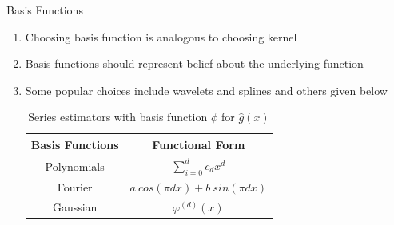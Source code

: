 \documentclass{beamer}
\begin{document}
\begin{frame}%
{Basis Functions}
\begin{enumerate}
\item Choosing basis function is analogous to choosing kernel 
\item Basis functions should represent belief about the underlying function 
\item Some popular choices include wavelets and splines and others given below 

\begin{table}[h]
\begin{center}
\begin{tabular}{|c|c|}
\hline
Basis Functions & Functional Form\\
\hline
Polynomials & $\sum_{i=0}^{d} c_d x^d$\\
Fourier &$a~cos(\pi d x) + b~sin(\pi d x)$\\
Gaussian &$\varphi^{(d)}(x)$\\
\hline
\end{tabular}
\caption{Series estimators with basis function $\phi$ for $\hat{g}(x)$}
\label{tab:basis}
\end{center}
\end{table}

\end{enumerate}
\end{frame}
\end{document}
